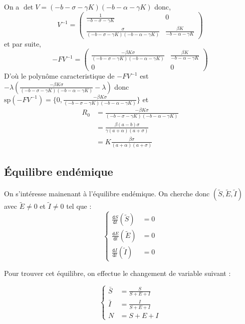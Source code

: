 \documentclass[11pt]{article}
\newcommand{\deriv}{\texttt{d}}
\newcommand{\dt}[1]{\frac{\deriv #1}{\deriv t}}
\begin{document}
On a $\det V = (-b - \sigma -\gamma K)(-b-\alpha - \gamma K)$  donc,
\[
V^{-1} = \begin{pmatrix}
	\frac{1}{- b- \sigma - \gamma K} & 0 \\ 
	\frac{\sigma}{(-b - \sigma -\gamma K)(-b-\alpha - \gamma K)} & \frac{\beta K}{-b -\alpha - \gamma K}
\end{pmatrix}
\]
et par suite, 
\[
-F V^{-1} = 
\begin{pmatrix}
	\frac{-\beta K \sigma }{(-b - \sigma -\gamma K)(-b-\alpha - \gamma K)} & \frac{\beta K}{-b -\alpha - \gamma K} \\ 
	0 & 0
\end{pmatrix}
\]
D'o\`u le polyn\^ome caracteristique de $-FV^{-1}$ est $-\lambda \left(\frac{-\beta K \sigma }{(-b - \sigma -\gamma K)(-b-\alpha - \gamma K)} - \lambda \right)$ donc $\text{sp} (-FV^{-1}) = \{0, \frac{-\beta K \sigma }{(-b - \sigma -\gamma K)(-b-\alpha - \gamma K)} \}$ et 
\begin{align*}
 R_0 &=\frac{-\beta K \sigma }{(-b - \sigma -\gamma K)(-b-\alpha - \gamma K)}\\
 	 &= \frac{\beta (a-b) \sigma}{\gamma (a + \alpha)(a+\sigma)} \\
 	 &= K \frac{\beta \sigma}{(a + \alpha)(a+\sigma)}
 \end{align*}


\subsection{\'Equilibre end\'emique}
On s'int\'eresse mainenant \`a l'\'equilibre end\'emique. On cherche donc  $(\tilde S, \tilde E, \tilde I)$ avec $\tilde E \neq 0$ et $\tilde I \neq 0$ tel que :
\[
\left\{
	\begin{aligned}
		\dt S (\tilde S) &= 0\\
		\dt E (\tilde E) &= 0\\
		\dt I (\tilde I) &= 0
	\end{aligned}\right.
\] 

Pour trouver cet \'equilibre, on effectue le changement de variable suivant :

\[
\left\{
	\begin{aligned}
		\bar S &= \frac{S}{S+E+I}\\
		\bar I &= \frac{I}{S+E+I}\\
		N &= S+E+I
	\end{aligned}\right.
\] 
\end{document}
